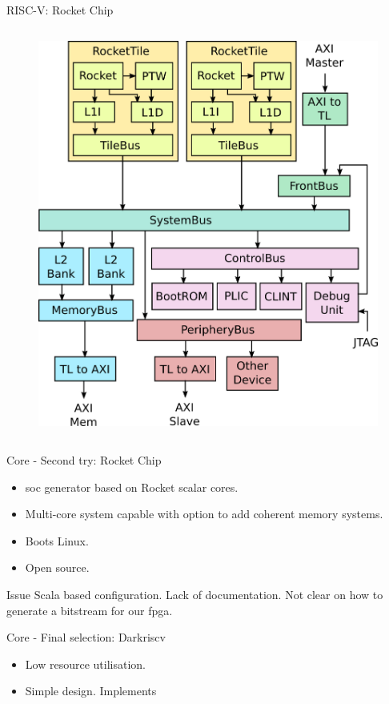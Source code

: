 \begin{frame}{RISC-V: Rocket Chip}
\begin{columns}[T]
\begin{column}{.5\textwidth}
\begin{figure}[!ht]
    \includegraphics[width=1\linewidth]{images/rocketchip-diagram.png}
\end{figure}
\end{column}
\end{columns}
\end{frame}

\begin{frame}{Core - Second try: Rocket Chip}
  \begin{itemize}
    \item \gls{soc} generator based on Rocket scalar cores.
    \item Multi-core system capable with option to add coherent memory systems.
    \item Boots Linux.
    \item Open source.
  \end{itemize}

  \begin{alertblock}{Issue}
    Scala based configuration. Lack of documentation. Not clear on how to generate a bitstream for our \gls{fpga}.
  \end{alertblock}
\end{frame}


\begin{frame}{Core - Final selection: Darkriscv}
  \begin{itemize}
    \item Low resource utilisation.
    \item Simple design. Implements 
  \end{itemize}
\end{frame}